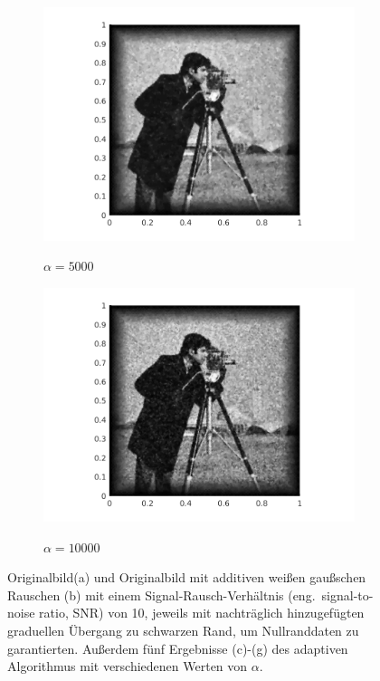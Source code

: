 \begin{figure}[!ht]
  \begin{subfigure}{.3\linewidth}
    \caption{$\alpha=5000$}
    \includegraphics[trim = 60 0 60 20, clip, width=\linewidth]
      {pictures/introBeta/snr10/05000.png}
    \label{fig:snr10alpha5000}
  \end{subfigure}
  \begin{subfigure}{.3\linewidth}
    \caption{$\alpha=10000$}
    \includegraphics[trim = 60 0 60 20, clip, width=\linewidth]
      {pictures/introBeta/snr10/10000.png}
    \label{fig:snr10alpha10000}
  \end{subfigure}
  \caption{Originalbild\protect\footnotemark (a) und
    Originalbild mit additiven weißen gaußschen Rauschen (b) mit einem
    Signal-Rausch-Verhältnis (eng.\ signal-to-noise ratio, SNR) von 10, jeweils
    mit nachträglich hinzugefügten graduellen Übergang zu schwarzen Rand, um 
    Nullranddaten zu garantierten. Außerdem fünf Ergebnisse (c)-(g) des adaptiven
    Algorithmus mit verschiedenen Werten von $\alpha$.}
  \label{fig:exampleDenoising}
\end{figure}

